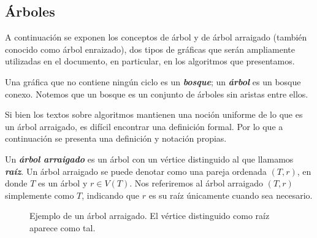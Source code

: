 \subsection{Árboles}

A continuación se exponen los conceptos de árbol y de árbol arraigado (también conocido como árbol enraizado), dos tipos de gráficas que serán ampliamente utilizadas en el documento, en particular, en los algoritmos que presentamos.

Una gráfica que no contiene ningún ciclo es un \emph{\textbf{bosque}}; un \emph{\textbf{árbol}} es un bosque conexo. Notemos que un bosque es un conjunto de árboles sin aristas entre ellos.

Si bien los textos sobre algoritmos mantienen una noción uniforme de lo que es un árbol arraigado, es difícil encontrar una definición formal. Por lo que a continuación se presenta una definición y notación propias.

Un \textbf{\emph{árbol arraigado}} es un árbol con un vértice distinguido al que llamamos \textbf{\emph{raíz}}. Un árbol arraigado se puede denotar como una pareja ordenada $(T,r)$, en donde $T$ es un árbol y $r \in V(T)$. Nos referiremos al árbol arraigado $(T,r)$ simplemente como $T$, indicando que $r$ es su raíz únicamente cuando sea necesario.

\begin{figure}[!htbp]
\centering
\begin{subfigure}{\textwidth}
\centering
{}
\end{subfigure}
\caption{Ejemplo de un árbol arraigado. El vértice distinguido como raíz aparece como tal.}
\label{fig_ejemplo_arbol}
\end{figure}

